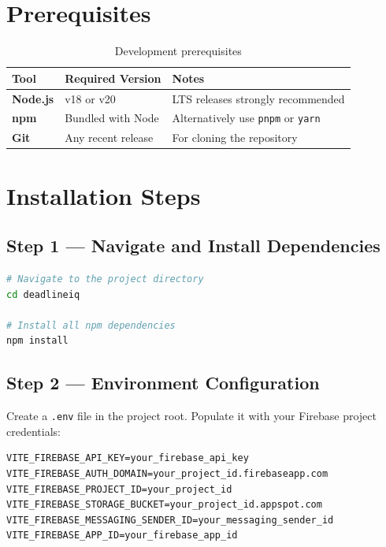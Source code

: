 \documentclass[12pt,a4paper]{report}
\begin{document}
\section{Prerequisites}

\begin{table}[H]
  \centering
  \renewcommand{\arraystretch}{1.4}
  \begin{tabular}{>{\bfseries}l l l}
    \toprule
    \textbf{Tool} & \textbf{Required Version} & \textbf{Notes} \\
    \midrule
    Node.js & v18 or v20 & LTS releases strongly recommended \\
    npm     & Bundled with Node & Alternatively use \texttt{pnpm} or \texttt{yarn} \\
    Git     & Any recent release & For cloning the repository \\
    \bottomrule
  \end{tabular}
  \caption{Development prerequisites}
\end{table}

\section{Installation Steps}

\subsection{Step 1 — Navigate and Install Dependencies}

\begin{tcolorbox}[codebox]
\begin{lstlisting}[language=bash]
# Navigate to the project directory
cd deadlineiq

# Install all npm dependencies
npm install
\end{lstlisting}
\end{tcolorbox}

\subsection{Step 2 — Environment Configuration}

Create a \texttt{.env} file in the project root. Populate it with your Firebase project credentials:

\begin{tcolorbox}[codebox]
\begin{lstlisting}[numbers=none]
VITE_FIREBASE_API_KEY=your_firebase_api_key
VITE_FIREBASE_AUTH_DOMAIN=your_project_id.firebaseapp.com
VITE_FIREBASE_PROJECT_ID=your_project_id
VITE_FIREBASE_STORAGE_BUCKET=your_project_id.appspot.com
VITE_FIREBASE_MESSAGING_SENDER_ID=your_messaging_sender_id
VITE_FIREBASE_APP_ID=your_firebase_app_id
\end{lstlisting}
\end{tcolorbox}
\end{document}
